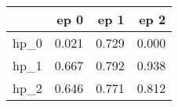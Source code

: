 \begin{tabular}{lrrr}
\toprule
{} &   ep 0 &   ep 1 &   ep 2 \\
\midrule
hp\_0 &  0.021 &  0.729 &  0.000 \\
hp\_1 &  0.667 &  0.792 &  0.938 \\
hp\_2 &  0.646 &  0.771 &  0.812 \\
\bottomrule
\end{tabular}
